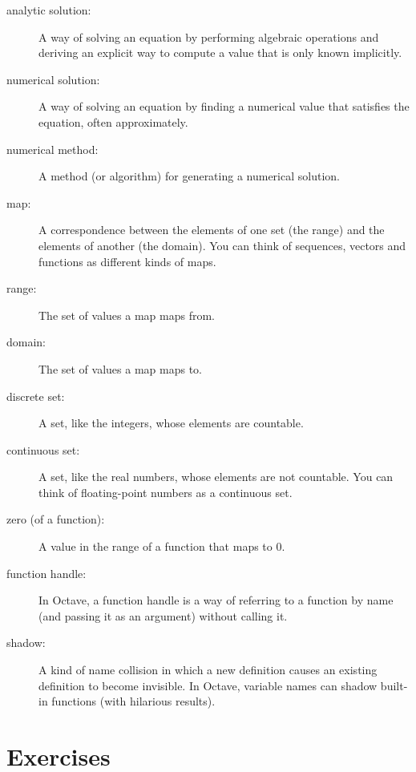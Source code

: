 \documentclass{book}
\begin{document}
\begin{description}

\item[analytic solution:] A way of solving an equation by performing
algebraic operations and deriving an explicit way to
compute a value that is only known implicitly.

\item[numerical solution:] A way of solving an equation by finding
a numerical value that satisfies the equation, often approximately.

\item[numerical method:] A method (or algorithm) for generating
a numerical solution.

\item[map:] A correspondence between the elements of one set (the
range) and the elements of another (the domain). You can think of
sequences, vectors and functions as different kinds of maps.

\item[range:] The set of values a map maps from.

\item[domain:] The set of values a map maps to.

\item[discrete set:] A set, like the integers, whose elements are
countable.

\item[continuous set:] A set, like the real numbers, whose elements
are not countable. You can think of floating-point numbers as a
continuous set.

\item[zero (of a function):] A value in the range of a function that
maps to 0.

\item[function handle:] In Octave, a function handle is a way of
referring to a function by name (and passing it as an argument)
without calling it.

\item[shadow:] A kind of name collision in which a new definition
causes an existing definition to become invisible. In Octave,
variable names can shadow built-in functions (with hilarious results). 

\end{description}

\section{Exercises}
\end{document}

